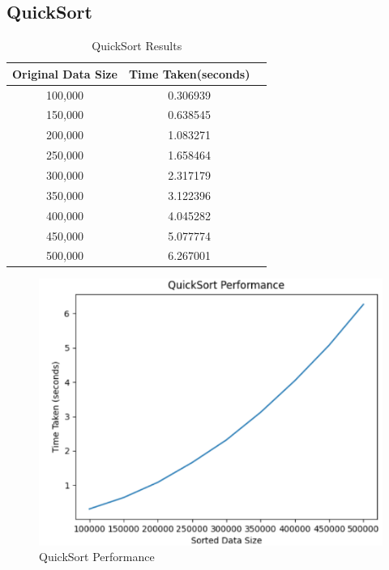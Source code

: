 \documentclass[a4paper, 9pt, twocolumn]{article}
\begin{document}
\subsection*{QuickSort}
\begin{table}[h]
  \centering
  \label{tab:quick_sort_table}
  \caption{QuickSort Results}
  \begin{tabular}{|c|c|c|}
    \hline
    \textbf{Original Data Size} & \textbf{Time Taken(seconds)} \\
    \hline
    100,000                     & 0.306939                     \\
    150,000                     & 0.638545                     \\
    200,000                     & 1.083271                     \\
    250,000                     & 1.658464                     \\
    300,000                     & 2.317179                     \\
    350,000                     & 3.122396                     \\
    400,000                     & 4.045282                     \\
    450,000                     & 5.077774                     \\
    500,000                     & 6.267001                     \\
    \hline
  \end{tabular}
\end{table}

\begin{figure}[h]
  \centering
  \includegraphics[width=0.8\linewidth]{quick_sort.png}  %
  \caption{QuickSort Performance}
  \label{fig:quick_sort}
\end{figure}
\end{document}
